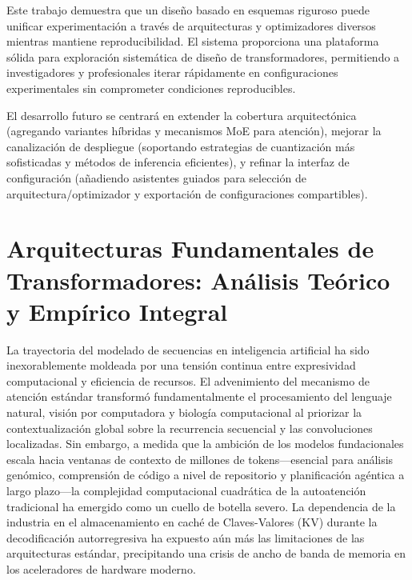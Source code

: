 \documentclass[11pt,a4paper]{article}
\begin{document}
Este trabajo demuestra que un diseño basado en esquemas riguroso puede unificar experimentación a través de arquitecturas y optimizadores diversos mientras mantiene reproducibilidad. El sistema proporciona una plataforma sólida para exploración sistemática de diseño de transformadores, permitiendo a investigadores y profesionales iterar rápidamente en configuraciones experimentales sin comprometer condiciones reproducibles.

El desarrollo futuro se centrará en extender la cobertura arquitectónica (agregando variantes híbridas y mecanismos MoE para atención), mejorar la canalización de despliegue (soportando estrategias de cuantización más sofisticadas y métodos de inferencia eficientes), y refinar la interfaz de configuración (añadiendo asistentes guiados para selección de arquitectura/optimizador y exportación de configuraciones compartibles).

\appendix

\section{Arquitecturas Fundamentales de Transformadores: Análisis Teórico y Empírico Integral}
\label{sec:appendix_transformer_architectures}

La trayectoria del modelado de secuencias en inteligencia artificial ha sido inexorablemente moldeada por una tensión continua entre expresividad computacional y eficiencia de recursos. El advenimiento del mecanismo de atención estándar transformó fundamentalmente el procesamiento del lenguaje natural, visión por computadora y biología computacional al priorizar la contextualización global sobre la recurrencia secuencial y las convoluciones localizadas. Sin embargo, a medida que la ambición de los modelos fundacionales escala hacia ventanas de contexto de millones de tokens---esencial para análisis genómico, comprensión de código a nivel de repositorio y planificación agéntica a largo plazo---la complejidad computacional cuadrática de la autoatención tradicional ha emergido como un cuello de botella severo. La dependencia de la industria en el almacenamiento en caché de Claves-Valores (KV) durante la decodificación autorregresiva ha expuesto aún más las limitaciones de las arquitecturas estándar, precipitando una crisis de ancho de banda de memoria en los aceleradores de hardware moderno.
\end{document}
